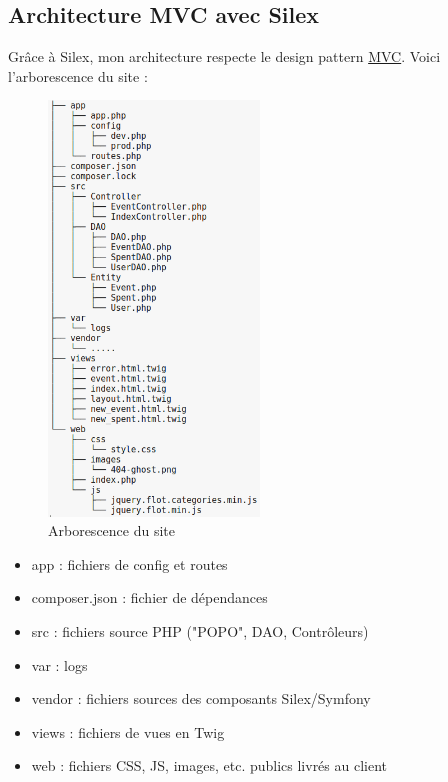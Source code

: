 \documentclass[a4paper, 12pt]{article}
\begin{document}
\subsection{Architecture MVC avec Silex}
Grâce à Silex, mon architecture respecte le design pattern \href{https://en.wikipedia.org/wiki/Model-view-controller}{MVC}.
Voici l'arborescence du site :
\begin{figure}
	\begin{center}
		\includegraphics[width=0.5\textwidth]{tree.png}
	\end{center}
	\caption{Arborescence du site}
\end{figure}

\begin{itemize}
	\item app : fichiers de config et routes
	\item composer.json : fichier de dépendances
	\item src : fichiers source PHP ("POPO", DAO, Contrôleurs)
	\item var : logs
	\item vendor : fichiers sources des composants Silex/Symfony
	\item views : fichiers de vues en Twig
	\item web : fichiers CSS, JS, images, etc. publics livrés au client
\end{itemize}
\end{document}
